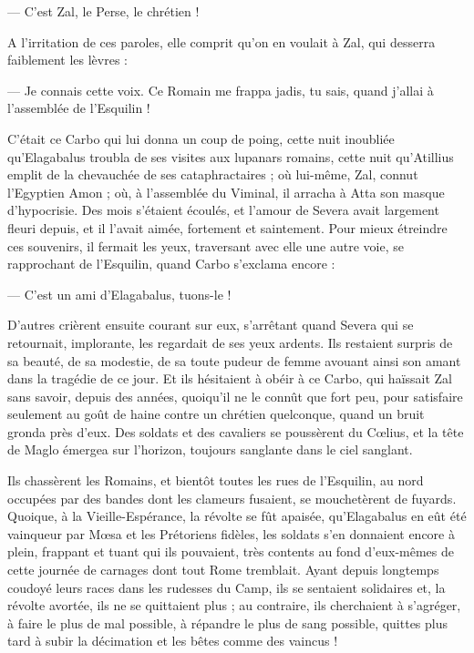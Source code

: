 \documentclass[a4paper, 11pt, oneside, polutonikogreek, french]{article}
\begin{document}
--- C'est Zal, le Perse, le chrétien !

A l'irritation de ces paroles, elle comprit qu'on en voulait à Zal, qui desserra faiblement les lèvres :

--- Je connais cette voix. Ce Romain me frappa jadis, tu sais, quand j'allai à l'assemblée de l'Esquilin !

C'était ce Carbo qui lui donna un coup de poing, cette nuit inoubliée qu'Elagabalus troubla de ses visites aux lupanars romains, cette nuit qu'Atillius emplit de la chevauchée de ses cataphractaires ; où lui-même, Zal, connut l'Egyptien Amon ; où, à l'assemblée du Viminal, il arracha à Atta son masque d'hypocrisie. Des mois s'étaient écoulés, et l'amour de Severa avait largement fleuri depuis, et il l'avait aimée, fortement et saintement. Pour mieux étreindre ces souvenirs, il fermait les yeux, traversant avec elle une autre voie, se rapprochant de l'Esquilin, quand Carbo s'exclama encore :

--- C'est un ami d'Elagabalus, tuons-le !

D'autres crièrent ensuite courant sur eux, s'arrêtant quand Severa qui se retournait, implorante, les regardait de ses yeux ardents. Ils restaient surpris de sa beauté, de sa modestie, de sa toute pudeur de femme avouant ainsi son amant dans la tragédie de ce jour. Et ils hésitaient à obéir à ce Carbo, qui haïssait Zal sans savoir, depuis des années, quoiqu'il ne le connût que fort peu, pour satisfaire seulement au goût de haine contre un chrétien quelconque, quand un bruit gronda près d'eux. Des soldats et des cavaliers se poussèrent du Cœlius, et la tête de Maglo émergea sur l'horizon, toujours sanglante dans le ciel sanglant.

Ils chassèrent les Romains, et bientôt toutes les rues de l'Esquilin, au nord occupées par des bandes dont les clameurs fusaient, se mouchetèrent de fuyards. Quoique, à la Vieille-Espérance, la révolte se fût apaisée, qu'Elagabalus en eût été vainqueur par Mœsa et les Prétoriens fidèles, les soldats s'en donnaient encore à plein, frappant et tuant qui ils pouvaient, très contents au fond d'eux-mêmes de cette journée de carnages dont tout Rome tremblait. Ayant depuis longtemps coudoyé leurs races dans les rudesses du Camp, ils se sentaient solidaires et, la révolte avortée, ils ne se quittaient plus ; au contraire, ils cherchaient à s'agréger, à faire le plus de mal possible, à répandre le plus de sang possible, quittes plus tard à subir la décimation et les bêtes comme des vaincus !
\end{document}
